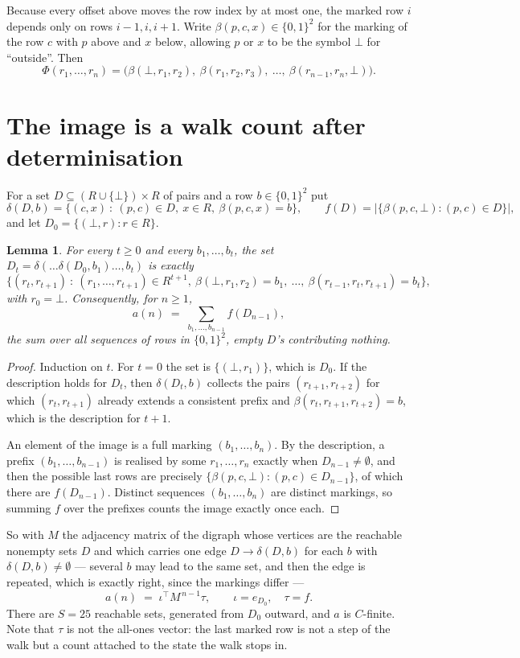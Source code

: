 \documentclass[11pt,a4paper]{article}
\theoremstyle{plain}
\newtheorem{lemma}[theorem]{Lemma}
\theoremstyle{definition}
\begin{document}
Because every offset above moves the row index by at most one, the marked row $i$ depends only
on rows $i-1,i,i+1$. Write $\beta(p,c,x)\in\{0,1\}^{2}$ for the marking of the row $c$
with $p$ above and $x$ below, allowing $p$ or $x$ to be the symbol $\bot$ for ``outside''.
Then
\[
\Phi(r_1,\dots,r_n)=\bigl(\beta(\bot,r_1,r_2),\ \beta(r_1,r_2,r_3),\ \dots,\
\beta(r_{n-1},r_n,\bot)\bigr).
\]

\section{The image is a walk count after determinisation}

For a set $D\subseteq(R\cup\{\bot\})\times R$ of pairs and a row $b\in\{0,1\}^{2}$ put
\[
\delta(D,b)=\{(c,x)\ :\ (p,c)\in D,\ x\in R,\ \beta(p,c,x)=b\},\qquad
f(D)=\bigl|\{\beta(p,c,\bot):(p,c)\in D\}\bigr| ,
\]
and let $D_0=\{(\bot,r):r\in R\}$.

\begin{lemma}\label{lem:det}
For every $t\ge0$ and every $b_1,\dots,b_t$, the set
$D_t=\delta(\dots\delta(D_0,b_1)\dots,b_t)$ is exactly
\[
\{(r_t,r_{t+1})\ :\ (r_1,\dots,r_{t+1})\in R^{t+1},\ \beta(\bot,r_1,r_2)=b_1,\ \dots,\
\beta(r_{t-1},r_t,r_{t+1})=b_t\} ,
\]
with $r_0=\bot$. Consequently, for $n\ge1$,
\[
a(n)\;=\;\sum_{b_1,\dots,b_{n-1}}f(D_{n-1}),
\]
the sum over all sequences of rows in $\{0,1\}^{2}$, empty $D$'s contributing nothing.
\end{lemma}

\begin{proof}
Induction on $t$. For $t=0$ the set is $\{(\bot,r_1)\}$, which is $D_0$. If the description
holds for $D_t$, then $\delta(D_t,b)$ collects the pairs $(r_{t+1},r_{t+2})$ for which
$(r_t,r_{t+1})$ already extends a consistent prefix and
$\beta(r_t,r_{t+1},r_{t+2})=b$, which is the description for $t+1$.

An element of the image is a full marking $(b_1,\dots,b_n)$. By the description, a prefix
$(b_1,\dots,b_{n-1})$ is realised by some $r_1,\dots,r_n$ exactly when $D_{n-1}\neq
\emptyset$, and then the possible last rows are precisely
$\{\beta(p,c,\bot):(p,c)\in D_{n-1}\}$, of which there are $f(D_{n-1})$. Distinct
sequences $(b_1,\dots,b_n)$ are distinct markings, so summing $f$ over the prefixes counts the
image exactly once each.
\end{proof}

So with $M$ the adjacency matrix of the digraph whose vertices are the reachable nonempty sets
$D$ and which carries one edge $D\to\delta(D,b)$ for each $b$ with $\delta(D,b)\neq\emptyset$
--- several $b$ may lead to the same set, and then the edge is repeated, which is exactly
right, since the markings differ ---
\[
a(n)\;=\;\iota^{\!\top}M^{\,n-1}\tau,\qquad \iota=e_{D_0},\quad \tau=f .
\]
There are $S=25$ reachable sets, generated from $D_0$ outward, and $a$ is $C$-finite. Note
that $\tau$ is not the all-ones vector: the last marked row is not a step of the walk but a
count attached to the state the walk stops in.
\end{document}
